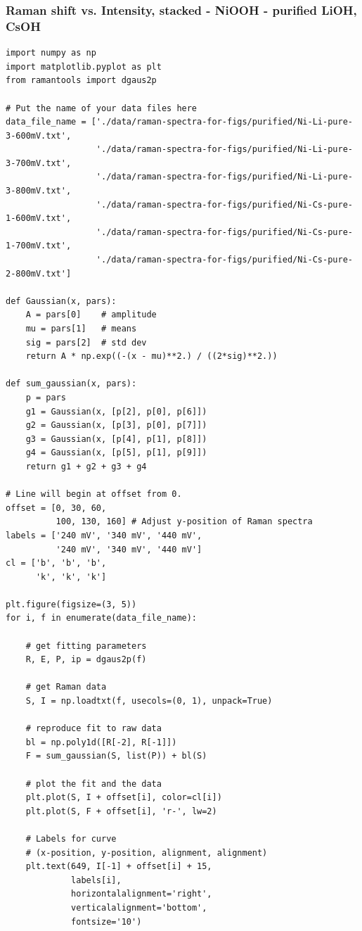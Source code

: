 \documentclass[journal=jpccck,manuscript=suppinfo,email=true]{achemso}
\begin{document}
\subsubsection{Raman shift vs. Intensity, stacked - NiOOH - purified LiOH, CsOH}
\label{sec-6-3-1}
\begin{verbatim}
import numpy as np
import matplotlib.pyplot as plt
from ramantools import dgaus2p

# Put the name of your data files here
data_file_name = ['./data/raman-spectra-for-figs/purified/Ni-Li-pure-3-600mV.txt',
                  './data/raman-spectra-for-figs/purified/Ni-Li-pure-3-700mV.txt',
                  './data/raman-spectra-for-figs/purified/Ni-Li-pure-3-800mV.txt',
                  './data/raman-spectra-for-figs/purified/Ni-Cs-pure-1-600mV.txt',
                  './data/raman-spectra-for-figs/purified/Ni-Cs-pure-1-700mV.txt',
                  './data/raman-spectra-for-figs/purified/Ni-Cs-pure-2-800mV.txt']

def Gaussian(x, pars):
    A = pars[0]    # amplitude
    mu = pars[1]   # means
    sig = pars[2]  # std dev
    return A * np.exp((-(x - mu)**2.) / ((2*sig)**2.))

def sum_gaussian(x, pars):
    p = pars
    g1 = Gaussian(x, [p[2], p[0], p[6]])
    g2 = Gaussian(x, [p[3], p[0], p[7]])
    g3 = Gaussian(x, [p[4], p[1], p[8]])
    g4 = Gaussian(x, [p[5], p[1], p[9]])
    return g1 + g2 + g3 + g4

# Line will begin at offset from 0.
offset = [0, 30, 60,
          100, 130, 160] # Adjust y-position of Raman spectra
labels = ['240 mV', '340 mV', '440 mV',
          '240 mV', '340 mV', '440 mV']
cl = ['b', 'b', 'b',
      'k', 'k', 'k']

plt.figure(figsize=(3, 5))
for i, f in enumerate(data_file_name):

    # get fitting parameters
    R, E, P, ip = dgaus2p(f)

    # get Raman data
    S, I = np.loadtxt(f, usecols=(0, 1), unpack=True)

    # reproduce fit to raw data
    bl = np.poly1d([R[-2], R[-1]])
    F = sum_gaussian(S, list(P)) + bl(S)

    # plot the fit and the data
    plt.plot(S, I + offset[i], color=cl[i])
    plt.plot(S, F + offset[i], 'r-', lw=2)

    # Labels for curve
    # (x-position, y-position, alignment, alignment)
    plt.text(649, I[-1] + offset[i] + 15,
             labels[i],
             horizontalalignment='right',
             verticalalignment='bottom',
             fontsize='10')


\end{verbatim}
\end{document}
